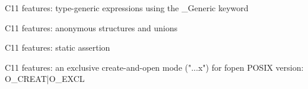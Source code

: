 \begin{frame}{C11 features: type-generic expressions using the \_Generic keyword}
    
\end{frame}
\begin{frame}{C11 features: anonymous structures and unions}
    
\end{frame}
\begin{frame}{C11 features: static assertion}
    
\end{frame}
\begin{frame}{C11 features: an exclusive create-and-open mode ("...x") for fopen}
    POSIX version: O\_CREAT|O\_EXCL
    
\end{frame}
